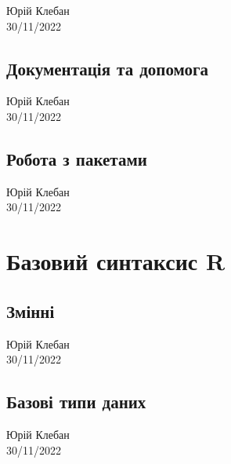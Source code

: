 \documentclass[
  letterpaper,
  DIV=11,
  numbers=noendperiod]{scrreprt}
\begin{document}
Юрій Клебан\\
30/11/2022

\hfill\break

\hypertarget{ux434ux43eux43aux443ux43cux435ux43dux442ux430ux446ux456ux44f-ux442ux430-ux434ux43eux43fux43eux43cux43eux433ux430}{%
\chapter{Документація та
допомога}\label{ux434ux43eux43aux443ux43cux435ux43dux442ux430ux446ux456ux44f-ux442ux430-ux434ux43eux43fux43eux43cux43eux433ux430}}

Юрій Клебан\\
30/11/2022

\hfill\break

\hypertarget{ux440ux43eux431ux43eux442ux430-ux437-ux43fux430ux43aux435ux442ux430ux43cux438}{%
\chapter{Робота з
пакетами}\label{ux440ux43eux431ux43eux442ux430-ux437-ux43fux430ux43aux435ux442ux430ux43cux438}}

Юрій Клебан\\
30/11/2022

\hfill\break

\part{Базовий синтаксис R}

\hypertarget{ux437ux43cux456ux43dux43dux456}{%
\chapter{Змінні}\label{ux437ux43cux456ux43dux43dux456}}

Юрій Клебан\\
30/11/2022

\hfill\break

\hypertarget{ux431ux430ux437ux43eux432ux456-ux442ux438ux43fux438-ux434ux430ux43dux438ux445}{%
\chapter{Базові типи
даних}\label{ux431ux430ux437ux43eux432ux456-ux442ux438ux43fux438-ux434ux430ux43dux438ux445}}

Юрій Клебан\\
30/11/2022

\hfill\break
\end{document}
